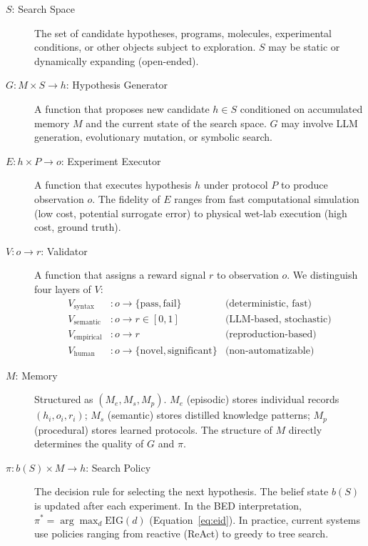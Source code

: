\documentclass[11pt]{article}
\begin{document}
\begin{description}
  \item[$S$: Search Space] The set of candidate hypotheses, programs, molecules, experimental conditions, or other objects subject to exploration. $S$ may be static or dynamically expanding (open-ended).

  \item[$G: M \times S \rightarrow h$: Hypothesis Generator] A function that proposes new candidate $h \in S$ conditioned on accumulated memory $M$ and the current state of the search space. $G$ may involve LLM generation, evolutionary mutation, or symbolic search.

  \item[$E: h \times P \rightarrow o$: Experiment Executor] A function that executes hypothesis $h$ under protocol $P$ to produce observation $o$. The fidelity of $E$ ranges from fast computational simulation (low cost, potential surrogate error) to physical wet-lab execution (high cost, ground truth).

  \item[$V: o \rightarrow r$: Validator] A function that assigns a reward signal $r$ to observation $o$. We distinguish four layers of $V$:
    \begin{align*}
      V_\text{syntax}   &: o \rightarrow \{\text{pass}, \text{fail}\} & \text{(deterministic, fast)}\\
      V_\text{semantic} &: o \rightarrow r \in [0,1]                  & \text{(LLM-based, stochastic)}\\
      V_\text{empirical}&: o \rightarrow r                            & \text{(reproduction-based)}\\
      V_\text{human}    &: o \rightarrow \{\text{novel}, \text{significant}\} & \text{(non-automatizable)}
    \end{align*}

  \item[$M$: Memory] Structured as $(M_e, M_s, M_p)$. $M_e$ (episodic) stores individual records $(h_i, o_i, r_i)$; $M_s$ (semantic) stores distilled knowledge patterns; $M_p$ (procedural) stores learned protocols. The structure of $M$ directly determines the quality of $G$ and $\pi$.

  \item[$\pi: b(S) \times M \rightarrow h$: Search Policy] The decision rule for selecting the next hypothesis. The belief state $b(S)$ is updated after each experiment. In the BED interpretation, $\pi^* = \arg\max_d \mathrm{EIG}(d)$ (Equation~\ref{eq:eid}). In practice, current systems use policies ranging from reactive (ReAct) to greedy to tree search.
\end{description}
\end{document}
